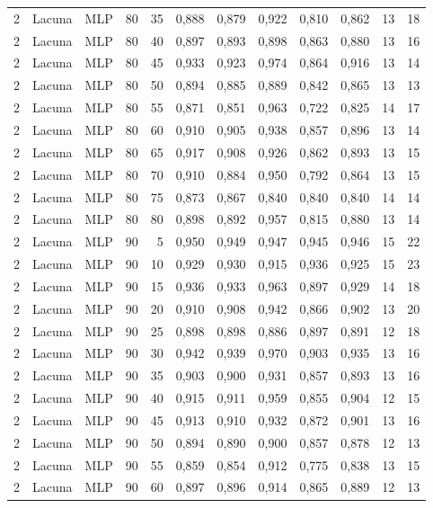 \begin{longtable}{@{}rllrrrrrrrrr@{}}
2 & Lacuna & MLP & 80 & 35 & 0,888 & 0,879 & 0,922 & 0,810 & 0,862 & 13 & 18 \\
2 & Lacuna & MLP & 80 & 40 & 0,897 & 0,893 & 0,898 & 0,863 & 0,880 & 13 & 16 \\
2 & Lacuna & MLP & 80 & 45 & 0,933 & 0,923 & 0,974 & 0,864 & 0,916 & 13 & 14 \\
2 & Lacuna & MLP & 80 & 50 & 0,894 & 0,885 & 0,889 & 0,842 & 0,865 & 13 & 13 \\
2 & Lacuna & MLP & 80 & 55 & 0,871 & 0,851 & 0,963 & 0,722 & 0,825 & 14 & 17 \\
2 & Lacuna & MLP & 80 & 60 & 0,910 & 0,905 & 0,938 & 0,857 & 0,896 & 13 & 14 \\
2 & Lacuna & MLP & 80 & 65 & 0,917 & 0,908 & 0,926 & 0,862 & 0,893 & 13 & 15 \\
2 & Lacuna & MLP & 80 & 70 & 0,910 & 0,884 & 0,950 & 0,792 & 0,864 & 13 & 15 \\
2 & Lacuna & MLP & 80 & 75 & 0,873 & 0,867 & 0,840 & 0,840 & 0,840 & 14 & 14 \\
2 & Lacuna & MLP & 80 & 80 & 0,898 & 0,892 & 0,957 & 0,815 & 0,880 & 13 & 14 \\
2 & Lacuna & MLP & 90 & 5 & 0,950 & 0,949 & 0,947 & 0,945 & 0,946 & 15 & 22 \\
2 & Lacuna & MLP & 90 & 10 & 0,929 & 0,930 & 0,915 & 0,936 & 0,925 & 15 & 23 \\
2 & Lacuna & MLP & 90 & 15 & 0,936 & 0,933 & 0,963 & 0,897 & 0,929 & 14 & 18 \\
2 & Lacuna & MLP & 90 & 20 & 0,910 & 0,908 & 0,942 & 0,866 & 0,902 & 13 & 20 \\
2 & Lacuna & MLP & 90 & 25 & 0,898 & 0,898 & 0,886 & 0,897 & 0,891 & 12 & 18 \\
2 & Lacuna & MLP & 90 & 30 & 0,942 & 0,939 & 0,970 & 0,903 & 0,935 & 13 & 16 \\
2 & Lacuna & MLP & 90 & 35 & 0,903 & 0,900 & 0,931 & 0,857 & 0,893 & 13 & 16 \\
2 & Lacuna & MLP & 90 & 40 & 0,915 & 0,911 & 0,959 & 0,855 & 0,904 & 12 & 15 \\
2 & Lacuna & MLP & 90 & 45 & 0,913 & 0,910 & 0,932 & 0,872 & 0,901 & 13 & 16 \\
2 & Lacuna & MLP & 90 & 50 & 0,894 & 0,890 & 0,900 & 0,857 & 0,878 & 12 & 13 \\
2 & Lacuna & MLP & 90 & 55 & 0,859 & 0,854 & 0,912 & 0,775 & 0,838 & 13 & 15 \\
2 & Lacuna & MLP & 90 & 60 & 0,897 & 0,896 & 0,914 & 0,865 & 0,889 & 12 & 13 \\

\end{longtable}
